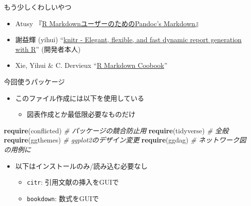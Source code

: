 \documentclass[
  12pt,
  ignorenonframetext,
]{beamer}
\newenvironment{Shaded}{\begin{snugshade}}{\end{snugshade}}
\newcommand{\CommentTok}[1]{\textcolor[rgb]{0.56,0.35,0.01}{\textit{#1}}}
\newcommand{\KeywordTok}[1]{\textcolor[rgb]{0.13,0.29,0.53}{\textbf{#1}}}
\newcommand{\NormalTok}[1]{#1}
\providecommand{\tightlist}{%
  \setlength{\itemsep}{0pt}\setlength{\parskip}{0pt}}
\begin{document}
\begin{frame}{もう少しくわしいやつ}
\protect\hypertarget{ux3082ux3046ux5c11ux3057ux304fux308fux3057ux3044ux3084ux3064}{}

\begin{itemize}
\tightlist
\item
  Atusy 『\href{https://atusy.booth.pm/items/1453002}{R
  MarkdownユーザーのためのPandoc's Markdown}』
\item
  謝益輝 (yihui) ``\href{https://yihui.org/knitr/}{knitr - Elegant,
  flexible, and fast dynamic report generation with R}'' (開発者本人)
\item
  Xie, Yihui \& C. Dervieux
  ``\href{https://bookdown.org/yihui/rmarkdown-cookbook/}{R Markdown
  Coobook}''
\end{itemize}

\end{frame}

\begin{frame}[fragile]{今回使うパッケージ}
\protect\hypertarget{ux4ecaux56deux4f7fux3046ux30d1ux30c3ux30b1ux30fcux30b8}{}

\begin{itemize}
\tightlist
\item
  このファイル作成には以下を使用している

  \begin{itemize}
  \tightlist
  \item
    図表作成とか最低限必要なものだけ
  \end{itemize}
\end{itemize}

\begin{Shaded}
\begin{Highlighting}[numbers=left,,]
\KeywordTok{require}\NormalTok{(conflicted) }\CommentTok{# パッケージの競合防止用}
\KeywordTok{require}\NormalTok{(tidyverse)  }\CommentTok{# 全般}
\KeywordTok{require}\NormalTok{(ggthemes)   }\CommentTok{# ggplot2のデザイン変更}
\KeywordTok{require}\NormalTok{(ggdag)      }\CommentTok{# ネットワーク図の用例に}
\end{Highlighting}
\end{Shaded}

\begin{itemize}
\tightlist
\item
  以下はインストールのみ/読み込む必要なし

  \begin{itemize}
  \tightlist
  \item
    \texttt{citr}: 引用文献の挿入をGUIで
  \item
    \texttt{bookdown}: 数式をGUIで
  \end{itemize}
\end{itemize}

\end{frame}
\end{document}
